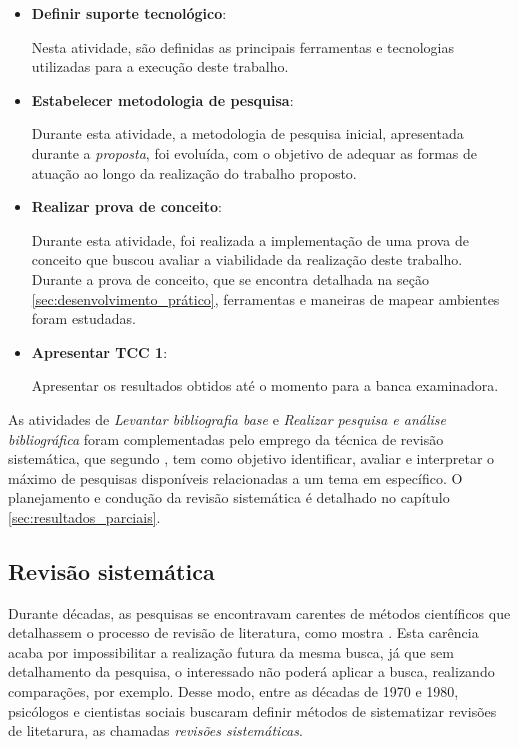 \begin{itemize}
	\item \textbf{Definir suporte tecnológico}:

		Nesta atividade, são definidas as principais ferramentas e tecnologias utilizadas para a execução deste trabalho.

	\item \textbf{Estabelecer metodologia de pesquisa}:

		Durante esta atividade, a metodologia de pesquisa inicial, apresentada durante a \textit{proposta}, foi evoluída, com o objetivo de adequar as formas de atuação ao longo da realização do trabalho proposto.

	\item \textbf{Realizar prova de conceito}:

		Durante esta atividade, foi realizada a implementação de uma prova de conceito que buscou avaliar a viabilidade da realização deste trabalho. Durante a prova de conceito, que se encontra detalhada na seção \ref{sec:desenvolvimento_prático}, ferramentas e maneiras de mapear ambientes foram estudadas.

	\item \textbf{Apresentar TCC 1}:

		Apresentar os resultados obtidos até o momento para a banca examinadora.
\end{itemize}

As atividades de \textit{Levantar bibliografia base} e \textit{Realizar pesquisa e análise bibliográfica} foram complementadas pelo emprego da técnica de revisão sistemática, que segundo \cite{Kitchenham}, tem como objetivo identificar, avaliar e interpretar o máximo de pesquisas disponíveis relacionadas a um tema em específico. O planejamento e condução da revisão sistemática é detalhado no capítulo \ref{sec:resultados_parciais}.

\subsection{Revisão sistemática} %
\label{sec:revisao_sistematica}

	Durante décadas, as pesquisas se encontravam carentes de métodos científicos que detalhassem o processo de revisão de literatura, como mostra \cite{Kitchenham}. Esta carência acaba por impossibilitar a realização futura da mesma busca, já que sem detalhamento da pesquisa, o interessado não poderá aplicar a busca, realizando comparações, por exemplo. Desse modo, entre as décadas de 1970 e 1980, psicólogos e cientistas sociais buscaram definir métodos de sistematizar revisões de litetarura, as chamadas \textit{revisões sistemáticas}.


